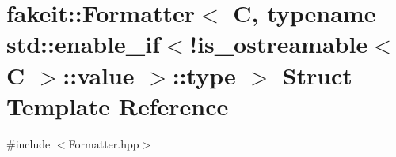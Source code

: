 \hypertarget{structfakeit_1_1Formatter_3_01C_00_01typename_01std_1_1enable__if_3_9is__ostreamable_3_01C_01_4_1_1value_01_4_1_1type_01_4}{}\section{fakeit\+::Formatter$<$ C, typename std\+::enable\+\_\+if$<$!is\+\_\+ostreamable$<$ C $>$\+::value $>$\+::type $>$ Struct Template Reference}
\label{structfakeit_1_1Formatter_3_01C_00_01typename_01std_1_1enable__if_3_9is__ostreamable_3_01C_01_4_1_1value_01_4_1_1type_01_4}


{\ttfamily \#include $<$Formatter.\+hpp$>$}

